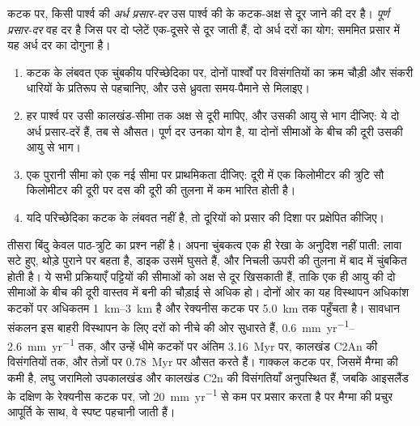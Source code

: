 \begin{definition}[अर्ध और पूर्ण प्रसार-दरें]\label{def:b1:plate-kinematics:spreading-rate}
कटक पर, किसी पार्श्व की \emph{अर्ध प्रसार-दर} उस पार्श्व की  के कटक-अक्ष से दूर जाने की दर है। \emph{पूर्ण प्रसार-दर} वह दर है जिस पर दो प्लेटें एक-दूसरे से दूर जाती हैं, दो अर्ध दरों का योग; सममित प्रसार में यह अर्ध दर का दोगुना है।
\end{definition}

\begin{method}[चुंबकीय विसंगतियों से एक प्रसार-दर]\label{met:b1:plate-kinematics:rate}
\begin{enumerate}
  \item कटक के लंबवत एक चुंबकीय परिच्छेदिका पर, दोनों पार्श्वों पर विसंगतियों का क्रम चौड़ी और संकरी धारियों के प्रतिरूप से पहचानिए, और उसे ध्रुवता समय-पैमाने से मिलाइए।
  \item हर पार्श्व पर उसी कालखंड-सीमा तक अक्ष से दूरी मापिए, और उसकी आयु से भाग दीजिए: ये दो अर्ध प्रसार-दरें हैं, तब से औसत। पूर्ण दर उनका योग है, या दोनों सीमाओं के बीच की दूरी उसकी आयु से भाग।
  \item एक पुरानी सीमा को एक नई सीमा पर प्राथमिकता दीजिए: दूरी में एक किलोमीटर की त्रुटि सौ किलोमीटर की दूरी पर दस की दूरी की तुलना में कम भारित होती है।
  \item यदि परिच्छेदिका कटक के लंबवत नहीं है, तो दूरियों को प्रसार की दिशा पर प्रक्षेपित कीजिए।
\end{enumerate}
\end{method}

तीसरा बिंदु केवल पाठ-त्रुटि का प्रश्न नहीं है।  अपना चुंबकत्व एक ही रेखा के अनुदिश नहीं पाती: लावा सटे हुए, थोड़े पुराने  पर बहता है, डाइक उसमें घुसते हैं, और निचली  ऊपरी की तुलना में बाद में चुंबकित होती है। ये सभी प्रक्रियाएँ पट्टियों की सीमाओं को अक्ष से दूर खिसकाती हैं, ताकि एक ही आयु की दो सीमाओं के बीच की दूरी वास्तव में बनी  की चौड़ाई से अधिक हो। दोनों ओर का यह विस्थापन अधिकांश कटकों पर अधिकतम \qtyrange{1}{3}{km} है और रेक्यनीस कटक पर \qty{5.0}{km} तक पहुँचता है। सावधान संकलन इस बाहरी विस्थापन के लिए दरों को नीचे की ओर सुधारते हैं, \qtyrange{0.6}{2.6}{mm.yr^{-1}} तक, और उन्हें धीमे कटकों पर अंतिम \qty{3.16}{Myr} पर, कालखंड C2An की विसंगतियों तक, और तेज़ों पर \qty{0.78}{Myr} पर औसत करते हैं। गाक्कल कटक पर, जिसमें मैग्मा की कमी है, लघु जरामिलो उपकालखंड और कालखंड C2n की विसंगतियाँ अनुपस्थित हैं, जबकि आइसलैंड के दक्षिण के रेक्यनीस कटक पर, जो \qty{20}{mm.yr^{-1}} से कम पर प्रसार करता है पर मैग्मा की प्रचुर आपूर्ति के साथ, वे स्पष्ट पहचानी जाती हैं।

